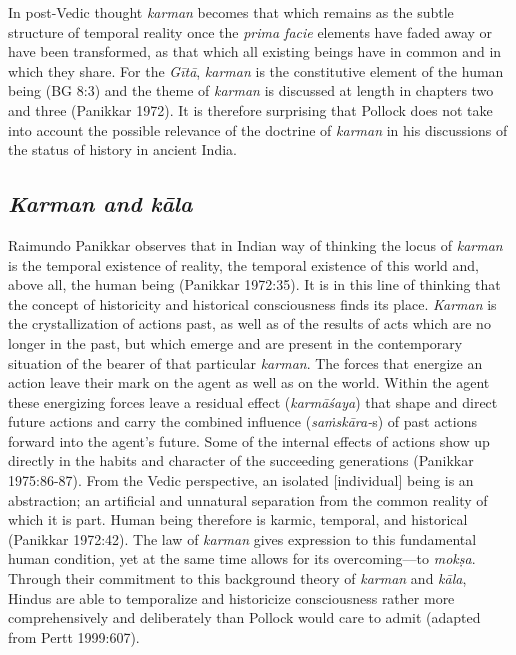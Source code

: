 \vskip 2pt

In post-Vedic thought \textit{karman} becomes that which remains as the subtle structure of temporal reality once the \textit{prima facie} elements have faded away or have been transformed, as that which all existing beings have in common and in which they share. For the \textit{Gītā}, \textit{karman} is the constitutive element of the human being (BG 8:3) and the theme of \textit{karman} is discussed at length in chapters two and three (Panikkar 1972). It is therefore surprising that Pollock does not take into account the possible relevance of the doctrine of \textit{karman} in his discussions of the status of history in ancient India.


\subsection*{\textit{Karman and kāla}}

Raimundo Panikkar observes that in Indian way of thinking the locus of \textit{karman} is the temporal existence of reality, the temporal existence of this world and, above all, the human being (Panikkar 1972:35). It is in this line of thinking that the concept of historicity and historical consciousness finds its place. \textit{Karman} is the crystallization of actions past, as well as of the results of acts which are no longer in the past, but which emerge and are present in the contemporary situation of the bearer of that particular \textit{karman}. The forces that energize an action leave their mark on the agent as well as on the world. Within the agent these energizing forces leave a residual effect (\textit{karmāśaya}) that shape and direct future actions and carry the combined influence (\textit{saṁskāra-}s) of past actions forward into the agent's future. Some of the internal effects of actions show up directly in the habits and character of the succeeding generations (Panikkar 1975:86-87). From the Vedic perspective, an isolated [individual] being is an abstraction; an artificial and unnatural separation from the common reality of which it is part. Human being therefore is karmic, temporal, and historical (Panikkar 1972:42). The law of \textit{karman} gives expression to this fundamental human condition, yet at the same time allows for its overcoming—to \textit{mokṣa}. Through their commitment to this background theory of \textit{karman} and \textit{kāla}, Hindus are able to temporalize and historicize consciousness rather more comprehensively and deliberately than Pollock would care to admit (adapted from Pertt 1999:607).

